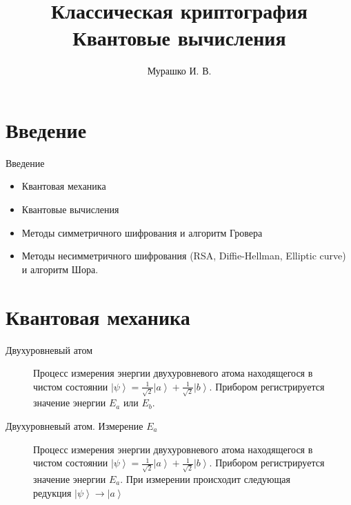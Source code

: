 \documentclass[10pt,pdf,hyperref={unicode}]{beamer}
\title[Криптография и квантовые вычисления]{Классическая
  криптография\\Квантовые вычисления}
\author{Мурашко И. В.}
\institute{Санкт Петербургский Государственный Политехнический Университет}
\date{}
\begin{document}
\begin{frame}
\titlepage
\end{frame}


\section{Введение}

\begin{frame}{Введение}
\begin{itemize}
\item Квантовая механика
\item Квантовые вычисления
\item Методы симметричного шифрования и алгоритм Гровера
\item Методы несимметричного шифрования (RSA, Diffie-Hellman, Elliptic
curve) и алгоритм Шора.
\end{itemize}
\end{frame}

\section{Квантовая механика}
\begin{frame}{Двухуровневый атом}
\begin{figure}
\centering



\caption{Процесс измерения энергии двухуровневого атома находящегося в
чистом состоянии $\left|\psi\right> = 
\frac{1}{\sqrt{2}}\left|a\right> + \frac{1}{\sqrt{2}}\left|b\right>$.
Прибором регистрируется значение энергии $E_a$ или $E_b$.
}
\label{fig:add:mesure_ex}
\end{figure}
\end{frame}

\begin{frame}{Двухуровневый атом. Измерение $E_a$}
\begin{figure}
\centering



\caption{Процесс измерения энергии двухуровневого атома находящегося в
чистом состоянии $\left|\psi\right> = 
\frac{1}{\sqrt{2}}\left|a\right> + \frac{1}{\sqrt{2}}\left|b\right>$.
Прибором регистрируется значение энергии $E_a$. При измерении
происходит следующая редукция $\left|\psi\right> \to \left|a\right>$
}
\label{fig:add:mesure_ex_a}
\end{figure}
\end{frame}
\end{document}
